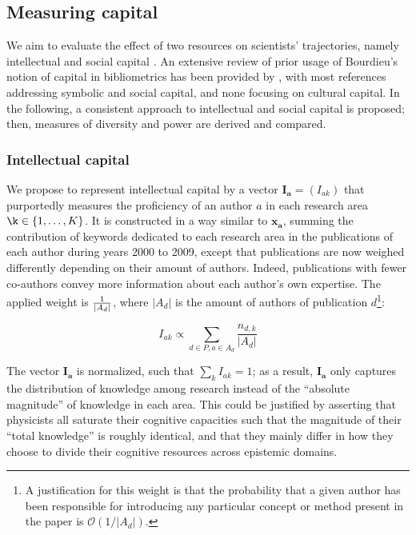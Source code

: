 \documentclass{article}
\begin{document}
\subsection{\label{sec:capital}Measuring capital}

We aim to evaluate the effect of two resources on scientists' trajectories, namely intellectual and social capital \citep{Bourdieu1986}. An extensive review of prior usage of Bourdieu's notion of capital in bibliometrics has been provided by \citet[p.~198-200]{Schirone2023}, with most references addressing symbolic and social capital, and none focusing on cultural capital. In the following, a consistent approach to intellectual and social capital is proposed; then, measures of diversity and power are derived and compared.

\subsubsection{Intellectual capital}

We propose to represent intellectual capital by a vector $\bm{I_a}=(I_{ak})$ that purportedly measures the proficiency of an author $a$ in each research area $\k \in \{1,\dots,K\}$. It is constructed in a way similar to $\bm{x_{a}}$, summing the contribution of keywords dedicated to each research area in the publications of each author during years 2000 to 2009, except that publications are now weighed differently depending on their amount of authors. Indeed, publications with fewer co-authors convey more information about each author's own expertise. The applied weight is $1 \over |A_d|$, where $|A_d|$ is the amount of authors of publication $d$\footnote{A justification for this weight is that the probability that a given author has been responsible for introducing any particular concept or method present in the paper is $\mathcal{O}(1/|A_d|)$. }:

\begin{equation}
    I_{ak} \propto  \sum_{d\in P,a\in A_d} \dfrac{n_{d,k}}{|A_d|}
\end{equation}

The vector $\bm{I_a}$ is normalized, such that $\sum_k I_{ak}=1$; as a result, $\bm{I_a}$ only captures the distribution of knowledge among research instead of the ``absolute magnitude'' of knowledge in each area. This could be justified by asserting that physicists all saturate their cognitive capacities such that the magnitude of their ``total knowledge'' is roughly identical, and that they mainly differ in how they choose to divide their cognitive resources across epistemic domains.
\end{document}
